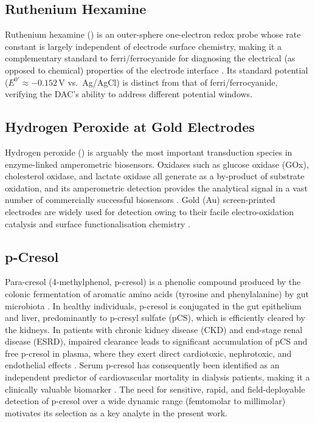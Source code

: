 \subsection{Ruthenium Hexamine}

Ruthenium hexamine (\ruhex{}) is an outer-sphere one-electron redox probe whose rate constant is largely independent of electrode surface chemistry, making it a complementary standard to ferri/ferrocyanide for diagnosing the electrical (as opposed to chemical) properties of the electrode interface \cite{McCreery2008}. Its standard potential ($E^{0'} \approx -0.152$\,V vs.\ Ag/AgCl) is distinct from that of ferri/ferrocyanide, verifying the DAC's ability to address different potential windows.

\subsection{Hydrogen Peroxide at Gold Electrodes}

Hydrogen peroxide () is arguably the most important transduction species in enzyme-linked amperometric biosensors. Oxidases such as glucose oxidase (GOx), cholesterol oxidase, and lactate oxidase all generate  as a by-product of substrate oxidation, and its amperometric detection provides the analytical signal in a vast number of commercially successful biosensors \cite{Heller2008}. Gold (Au) screen-printed electrodes are widely used for  detection owing to their facile electro-oxidation catalysis and surface functionalisation chemistry \cite{Fanjul-Bolado2008}.

\subsection{p-Cresol}

Para-cresol (4-methylphenol, p-cresol) is a phenolic compound produced by the colonic fermentation of aromatic amino acids (tyrosine and phenylalanine) by gut microbiota \cite{Vanholder2003, Ramezani2016}. In healthy individuals, p-cresol is conjugated in the gut epithelium and liver, predominantly to p-cresyl sulfate (pCS), which is efficiently cleared by the kidneys. In patients with chronic kidney disease (CKD) and end-stage renal disease (ESRD), impaired clearance leads to significant accumulation of pCS and free p-cresol in plasma, where they exert direct cardiotoxic, nephrotoxic, and endothelial effects \cite{Meijers2010}. Serum p-cresol has consequently been identified as an independent predictor of cardiovascular mortality in dialysis patients, making it a clinically valuable biomarker \cite{Liabeuf2010}. The need for sensitive, rapid, and field-deployable detection of p-cresol over a wide dynamic range (femtomolar to millimolar) motivates its selection as a key analyte in the present work.


